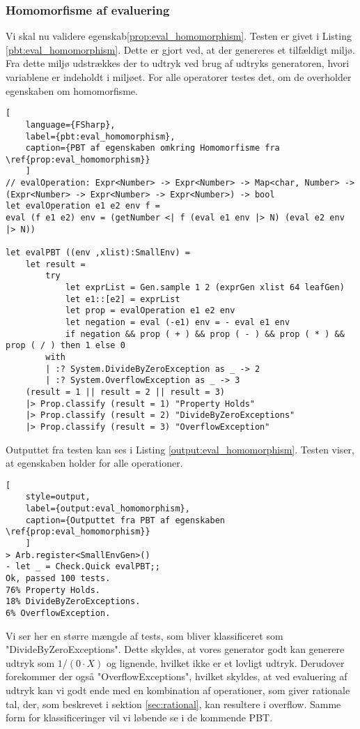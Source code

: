 \subsubsection{Homomorfisme af evaluering}\label{sec:PBT_eval_homomorphism}

Vi skal nu validere egenskab\ref{prop:eval_homomorphism}. Testen er givet i Listing \ref{pbt:eval_homomorphism}. Dette er gjort ved, at der genereres et tilfældigt miljø. Fra dette miljø udstrækkes der to udtryk ved brug af udtryks generatoren, hvori variablene er indeholdt i miljøet. For alle operatorer testes det, om de overholder egenskaben om homomorfisme.


\begin{lstlisting}[
    language={FSharp}, 
    label={pbt:eval_homomorphism}, 
    caption={PBT af egenskaben omkring Homomorfisme fra \ref{prop:eval_homomorphism}}
    ]
// evalOperation: Expr<Number> -> Expr<Number> -> Map<char, Number> -> (Expr<Number> -> Expr<Number> -> Expr<Number>) -> bool
let evalOperation e1 e2 env f =
eval (f e1 e2) env = (getNumber <| f (eval e1 env |> N) (eval e2 env |> N))
 
let evalPBT ((env ,xlist):SmallEnv) = 
    let result = 
        try
            let exprList = Gen.sample 1 2 (exprGen xlist 64 leafGen)
            let e1::[e2] = exprList
            let prop = evalOperation e1 e2 env
            let negation = eval (-e1) env = - eval e1 env
            if negation && prop ( + ) && prop ( - ) && prop ( * ) && prop ( / ) then 1 else 0
        with
        | :? System.DivideByZeroException as _ -> 2
        | :? System.OverflowException as _ -> 3
    (result = 1 || result = 2 || result = 3)
    |> Prop.classify (result = 1) "Property Holds"
    |> Prop.classify (result = 2) "DivideByZeroExceptions"
    |> Prop.classify (result = 3) "OverflowException"    
\end{lstlisting}

Outputtet fra testen kan ses i Listing \ref{output:eval_homomorphism}. Testen viser, at egenskaben holder for alle operationer.

\begin{lstlisting}[
    style=output, 
    label={output:eval_homomorphism}, 
    caption={Outputtet fra PBT af egenskaben \ref{prop:eval_homomorphism}}
    ]
> Arb.register<SmallEnvGen>()
- let _ = Check.Quick evalPBT;;
Ok, passed 100 tests.
76% Property Holds.
18% DivideByZeroExceptions.
6% OverflowException.
\end{lstlisting}
Vi ser her en større mængde af tests, som bliver klassificeret som "DivideByZeroExceptions". Dette skyldes, at vores generator godt kan generere udtryk som \(1/(0 \cdot X)\) og lignende, hvilket ikke er et lovligt udtryk. Derudover forekommer der også "OverflowExceptions", hvilket skyldes, at ved evaluering af udtryk kan vi godt ende med en kombination af operationer, som giver rationale tal, der, som beskrevet i sektion \ref{sec:rational}, kan resultere i overflow. Samme form for klassificeringer vil vi løbende se i de kommende PBT.




